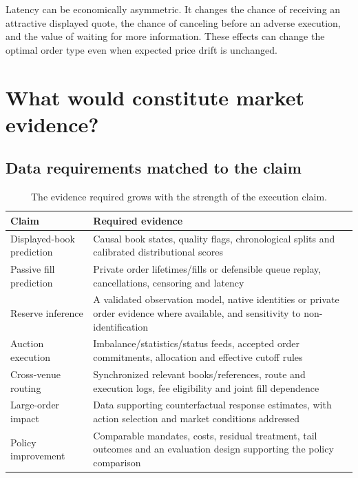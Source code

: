 \documentclass[11pt]{article}
\numberwithin{equation}{section}
\theoremstyle{definition}
\theoremstyle{remark}
\theoremstyle{definition}
\begin{document}
Latency can be economically asymmetric. It changes the chance of receiving
an attractive displayed quote, the chance of canceling before an adverse
execution, and the value of waiting for more information. These effects can
change the optimal order type even when expected price drift is unchanged.







\section{What would constitute market evidence?}\label{sec:validation}

\subsection{Data requirements matched to the claim}

\begin{table}[tb]
\centering\small
\caption{The evidence required grows with the strength of the execution claim.}\label{tab:evidence}
\begin{tabularx}{\textwidth}{YY}
\toprule Claim & Required evidence \\\midrule
Displayed-book prediction & Causal book states, quality flags, chronological splits and calibrated distributional scores \\
Passive fill prediction & Private order lifetimes/fills or defensible queue replay, cancellations, censoring and latency \\
Reserve inference & A validated observation model, native identities or private order evidence where available, and sensitivity to non-identification \\
Auction execution & Imbalance/statistics/status feeds, accepted order commitments, allocation and effective cutoff rules \\
Cross-venue routing & Synchronized relevant books/references, route and execution logs, fee eligibility and joint fill dependence \\
Large-order impact & Data supporting counterfactual response estimates, with action selection and market conditions addressed \\
Policy improvement & Comparable mandates, costs, residual treatment, tail outcomes and an evaluation design supporting the policy comparison \\
\bottomrule
\end{tabularx}
\end{table}
\end{document}
